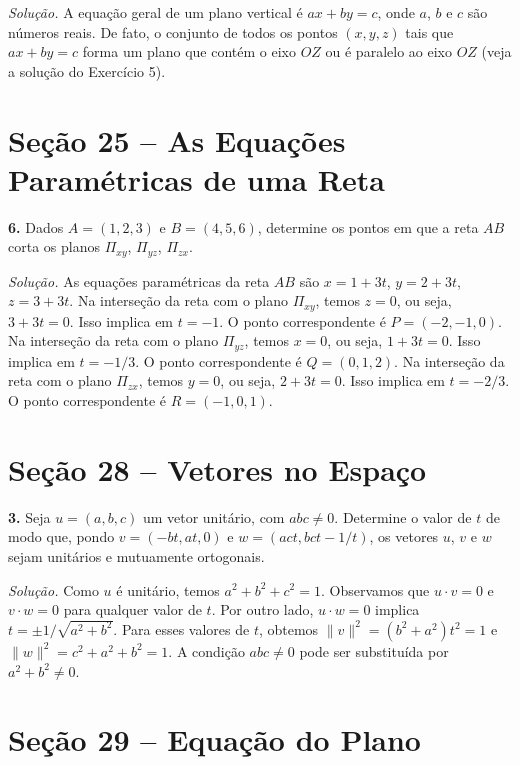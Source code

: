 \documentclass[a4paper,11pt]{article}
\begin{document}
\emph{Solução.}
A equação geral de um plano vertical é $ax + by = c$, onde $a$, $b$ e $c$ são números reais.
De fato, o conjunto de todos os pontos $(x,y,z)$ tais que $ax + by = c$ forma um plano que contém o eixo $OZ$ ou é paralelo ao eixo $OZ$ (veja a solução do Exercício 5).

\section*{Seção 25 -- As Equações Paramétricas de uma Reta}

\textbf{6.}
Dados $A = (1,2,3)$ e $B = (4,5,6)$, determine os pontos em que a reta $AB$ corta os planos $\Pi_{xy}$, $\Pi_{yz}$, $\Pi_{zx}$.

\vspace{\baselineskip}

\emph{Solução.}
As equações paramétricas da reta $AB$ são $x = 1 + 3t$, $y = 2 + 3t$, $z = 3 + 3t$.
Na interseção da reta com o plano $\Pi_{xy}$, temos $z = 0$, ou seja, $3 + 3t = 0$.
Isso implica em $t = -1$.
O ponto correspondente é $P = (-2,-1,0)$.
Na interseção da reta com o plano $\Pi_{yz}$, temos $x = 0$, ou seja, $1 + 3t = 0$.
Isso implica em $t = -1/3$.
O ponto correspondente é $Q = (0,1,2)$.
Na interseção da reta com o plano $\Pi_{zx}$, temos $y = 0$, ou seja, $2 + 3t = 0$.
Isso implica em $t = -2/3$.
O ponto correspondente é $R = (-1,0,1)$.

\section*{Seção 28 -- Vetores no Espaço}

\textbf{3.}
Seja $u = (a, b, c)$ um vetor unitário, com $abc \neq 0$.
Determine o valor de $t$ de modo que, pondo $v = (-bt, at, 0)$ e $w = (act, bct -1/t)$, os vetores $u$, $v$ e $w$ sejam unitários e mutuamente ortogonais.

\vspace{\baselineskip}

\emph{Solução.}
Como $u$ é unitário, temos $a^2 + b^2 + c^2 = 1$.
Observamos que $u \cdot v = 0$ e $v \cdot w = 0$ para qualquer valor de $t$.
Por outro lado, $u \cdot w = 0$ implica $t = \pm 1/\sqrt{a^2 + b^2}$.
Para esses valores de $t$, obtemos $\| v \|^2 = (b^2 + a^2)t^2 = 1$ e $\| w \|^2 = c^2 + a^2 + b^2 = 1$.
A condição $abc \neq 0$ pode ser substituída por $a^2 + b^2 \neq 0$.

\section*{Seção 29 -- Equação do Plano}
\end{document}
